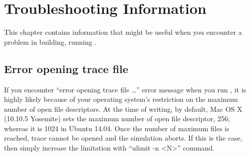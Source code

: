 \chapter{Troubleshooting Information}
\label{sec:troubleshooting}
This chapter contains information that might be useful when you encounter 
a problem in building, running \SIM.

\section{Error opening trace file}

If you encounter ``error opening trace file \ldots'' error message when you run \SIM, it is highly likely because of your operating system's restriction on the maximum number of open file descriptors. At the time of writing, by default, Mac OS X (10.10.5 Yosemite) sets the maximum number of open file descriptor, 256; whereas it is 1024 in Ubuntu 14.04. Once the number of maximum files is reached, trace cannot be opened and the simulation aborts. If this is the case, then simply increase the limitation with ``ulimit -n <N>'' command.
